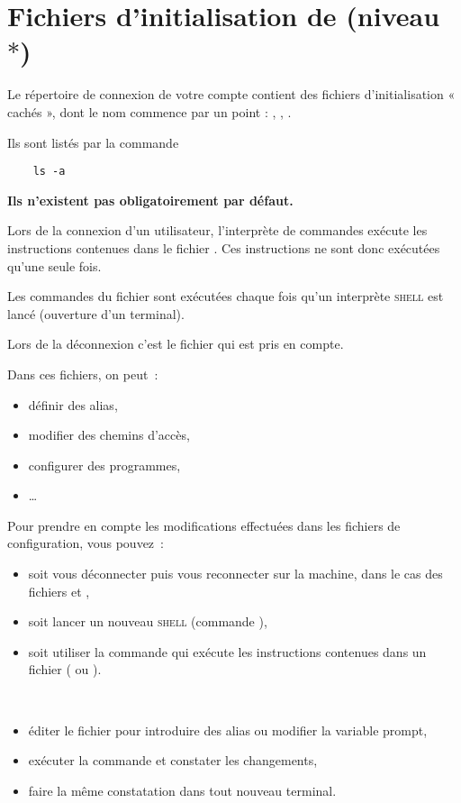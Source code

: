 \documentclass[a4paper,11pt]{article}
\begin{document}
\section{Fichiers d'initialisation de  (niveau $*$)}
\label{bashrc}

Le répertoire de connexion de votre compte contient des fichiers
d'initialisation « cachés », dont le nom commence par un point :
, , .

Ils sont listés par la commande

\verb+    ls -a+

\textbf{Ils n'existent pas obligatoirement par défaut.}

Lors de la connexion d'un utilisateur, l'interprète de commandes
exécute les instructions contenues dans le fichier . Ces
instructions ne sont donc exécutées qu'une seule fois.

Les commandes du fichier  sont exécutées chaque fois qu'un
interprète \textsc{shell}  est lancé (ouverture d'un terminal).

Lors de la déconnexion c'est le fichier  qui est pris en compte.

Dans ces fichiers, on peut :

\begin{itemize}
  \item définir des alias,
  \item modifier des chemins d'accès,
  \item configurer des programmes,
  \item \ldots
\end{itemize}
Pour prendre en compte les modifications effectuées dans les fichiers de
configuration, vous pouvez :

\begin{itemize}
  \item soit vous déconnecter puis vous reconnecter sur la machine, dans le
        cas des fichiers  et ,
  \item soit lancer un nouveau \textsc{shell} (commande ),
  \item soit utiliser la commande  qui exécute les instructions
        contenues dans un fichier ( ou ).
\end{itemize}

\

\begin{maw}
\begin{itemize}
  \item éditer le fichier  pour introduire des alias ou
        modifier la variable prompt,
  \item exécuter la commande  et constater les
        changements,
  \item faire la même constatation dans tout nouveau terminal.
\end{itemize}
\end{maw}
\end{document}
